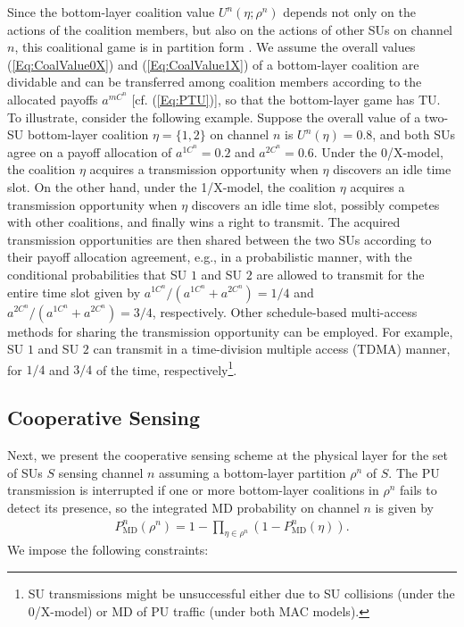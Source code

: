 \documentclass[journal,draftclsnofoot,onecolumn]{IEEEtran}
\theoremstyle{definition}
\begin{document}
Since the bottom-layer coalition value $U^n(\eta;\rho^n)$ depends not only on the actions of the coalition members, but also on the actions of other SUs on channel $n$, this coalitional game is in partition form \cite{CoalGameSurvey}. We assume the overall values (\ref{Eq:CoalValue0X}) and (\ref{Eq:CoalValue1X}) of a bottom-layer coalition are dividable and can be transferred among coalition members according to the allocated payoffs $a^{mC^n}$ [cf. (\ref{Eq:PTU})], so that the bottom-layer game has TU. To illustrate, consider the following example. Suppose the overall value of a two-SU bottom-layer coalition $\eta=\{1,2\}$ on channel $n$ is $U^n(\eta)=0.8$, and both SUs agree on a payoff allocation of $a^{1C^n}=0.2$ and $a^{2C^n}=0.6$. Under the 0/X-model, the coalition $\eta$ acquires a transmission opportunity when $\eta$ discovers an idle time slot. On the other hand, under the 1/X-model, the coalition $\eta$ acquires a transmission opportunity when $\eta$ discovers an idle time slot, possibly competes with other coalitions, and finally wins a right to transmit. The acquired transmission opportunities are then shared between the two SUs according to their payoff allocation agreement, e.g., in a probabilistic manner, with the conditional probabilities that SU $1$ and SU $2$ are allowed to transmit for the entire time slot given by $a^{1C^n}{/}(a^{1C^n}{+}a^{2C^n}){=}1/4$ and $a^{2C^n}{/}(a^{1C^n}{+}a^{2C^n}){=}3/4$, respectively. Other schedule-based multi-access methods for sharing the transmission opportunity can be employed. For example, SU $1$ and SU $2$ can transmit in a time-division multiple access (TDMA) manner, for $1/4$ and $3/4$ of the time, respectively\footnote{SU transmissions might be unsuccessful either due to SU collisions (under the 0/X-model) or MD of PU traffic (under both MAC models).}. 

\subsection{Cooperative Sensing}\label{subsec:CoopSenseDef}
Next, we present the cooperative sensing scheme at the physical layer for the set of SUs $S$ sensing channel $n$ assuming a bottom-layer partition $\rho^n$ of $S$. The PU transmission is interrupted if one or more bottom-layer coalitions in $\rho^n$ fails to detect its presence, so the integrated MD probability on channel $n$ is given by
\begin{equation}\label{Eq:ChMD}
\begin{split}
P^n_\mathrm{MD}(\rho^n)=1-\prod_{\eta\in\rho^n}\left ( 1-P^n_\mathrm{MD}(\eta) \right ).
\end{split}
\end{equation}
We impose the following constraints:
\end{document}
